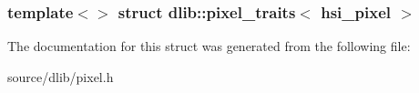 \subsubsection*{template$<$$>$ struct dlib::pixel\_\-traits$<$ hsi\_\-pixel $>$}



The documentation for this struct was generated from the following file:\begin{DoxyCompactItemize}
\item 
source/dlib/pixel.h\end{DoxyCompactItemize}
